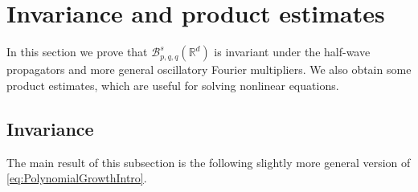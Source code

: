 \documentclass{amsart}
\theoremstyle{definition}
\newcommand {\Rd}{\mathbb{R}^{d}}
\newcommand {\Baspqq}{\mathcal{B}^{s}_{p,q,q}(\Rd)}
\numberwithin{equation}{section}
\begin{document}
\section{Invariance and product estimates}\label{sec:invariance}


In this section we prove that $\Baspqq$ is invariant under the half-wave propagators and more general oscillatory Fourier multipliers. We also obtain some product estimates, which are useful for solving nonlinear equations.

\subsection{Invariance}\label{subsec:invariance}

The main result of this subsection is the following slightly more general version of \eqref{eq:PolynomialGrowthIntro}.
\end{document}
